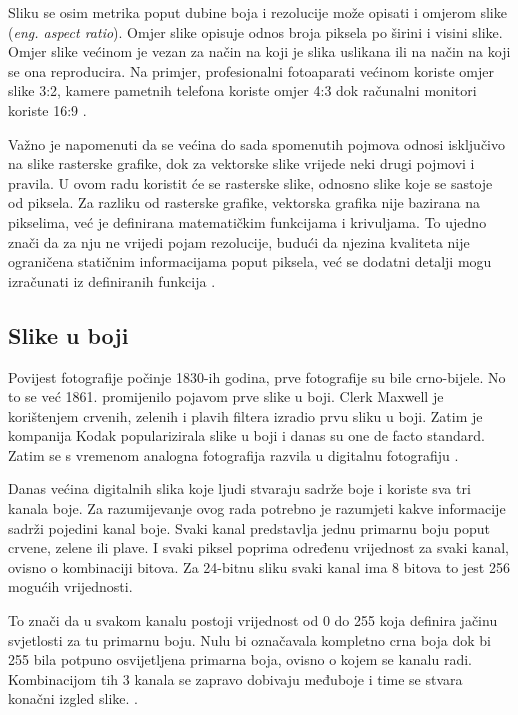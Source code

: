 \documentclass{foi}
\begin{document}
Sliku se osim metrika poput dubine boja i rezolucije može opisati i omjerom slike (\textit{eng. aspect ratio}). Omjer slike opisuje odnos broja piksela po širini i visini slike. Omjer slike većinom je vezan za način na koji je slika uslikana ili na način na koji se ona reproducira. Na primjer, profesionalni fotoaparati većinom koriste omjer slike 3:2, kamere pametnih telefona koriste omjer 4:3 dok računalni monitori koriste 16:9 \cite{AspectRatio}.

Važno je napomenuti da se većina do sada spomenutih pojmova odnosi isključivo na slike rasterske grafike, dok za vektorske slike vrijede neki drugi pojmovi i pravila. U ovom radu koristit će se rasterske slike, odnosno slike koje se sastoje od piksela. Za razliku od rasterske grafike, vektorska grafika nije bazirana na pikselima, već je definirana matematičkim funkcijama i krivuljama. To ujedno znači da za nju ne vrijedi pojam rezolucije, budući da njezina kvaliteta nije ograničena statičnim informacijama poput piksela, već se dodatni detalji mogu izračunati iz definiranih funkcija \cite{DigitalnaSlika}.

\subsection{Slike u boji}

Povijest fotografije počinje 1830-ih godina, prve fotografije su bile crno-bijele. No to se već 1861. promijenilo pojavom prve slike u boji. Clerk Maxwell je korištenjem crvenih, zelenih i plavih filtera izradio prvu sliku u boji. Zatim je kompanija Kodak popularizirala slike u boji i danas su one de facto standard. Zatim se s vremenom analogna fotografija razvila u digitalnu fotografiju \cite{ImageHistory}.

Danas većina digitalnih slika koje ljudi stvaraju sadrže boje i koriste sva tri kanala boje. Za razumijevanje ovog rada potrebno je razumjeti kakve informacije sadrži pojedini kanal boje. Svaki kanal predstavlja jednu primarnu boju poput crvene, zelene ili plave. I svaki piksel poprima određenu vrijednost za svaki kanal, ovisno o kombinaciji bitova. Za 24-bitnu sliku svaki kanal ima 8 bitova to jest 256 mogućih vrijednosti. 

To znači da u svakom kanalu postoji vrijednost od 0 do 255 koja definira jačinu svjetlosti za tu primarnu boju. Nulu bi označavala kompletno crna boja dok bi 255 bila potpuno osvijetljena primarna boja,  ovisno o kojem se kanalu radi. Kombinacijom tih 3 kanala se zapravo dobivaju međuboje i time se stvara konačni izgled slike. \cite{GrayscaleSlika}.
\end{document}
